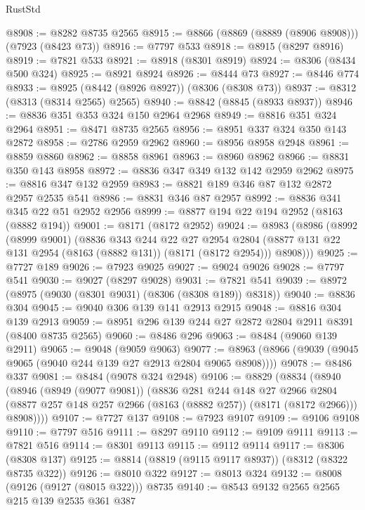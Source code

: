 \begin{lexlean}{RustStd}
\begin{coremodule}
@8908 := @8282 @8735 @2565
@8915 := @8866 (@8869 (@8889 (@8906 @8908))) (@7923 (@8423 @73))
@8916 := @7797 @533
@8918 := @8915 (@8297 @8916)
@8919 := @7821 @533
@8921 := @8918 (@8301 @8919)
@8924 := @8306 (@8434 @500 @324)
@8925 := @8921 @8924
@8926 := @8444 @73
@8927 := @8446 @774
@8933 := @8925 (@8442 (@8926 @8927)) (@8306 (@8308 @73))
@8937 := @8312 (@8313 (@8314 @2565) @2565)
@8940 := @8842 (@8845 (@8933 @8937))
@8946 := @8836 @351 @353 @324 @150 @2964 @2968
@8949 := @8816 @351 @324 @2964
@8951 := @8471 @8735 @2565
@8956 := @8951 @337 @324 @350 @143 @2872
@8958 := @2786 @2959 @2962
@8960 := @8956 @8958 @2948
@8961 := @8859 @8860
@8962 := @8858 @8961
@8963 := @8960 @8962
@8966 := @8831 @350 @143 @8958
@8972 := @8836 @347 @349 @132 @142 @2959 @2962
@8975 := @8816 @347 @132 @2959
@8983 := @8821 @189 @346 @87 @132 @2872 @2957 @2535 @541
@8986 := @8831 @346 @87 @2957
@8992 := @8836 @341 @345 @22 @51 @2952 @2956
@8999 := @8877 @194 @22 @194 @2952 (@8163 (@8882 @194))
@9001 := @8171 (@8172 @2952)
@9024 := @8983
    (@8986
      (@8992
        (@8999 @9001)
        (@8836
          @343
          @244
          @22
          @27
          @2954
          @2804
          (@8877 @131 @22 @131 @2954 (@8163 (@8882 @131)) (@8171 (@8172 @2954)))
          @8908)))
@9025 := @7727 @189
@9026 := @7923 @9025
@9027 := @9024 @9026
@9028 := @7797 @541
@9030 := @9027 (@8297 @9028)
@9031 := @7821 @541
@9039 := @8972 (@8975 (@9030 (@8301 @9031) (@8306 (@8308 @189)) @8318))
@9040 := @8836 @304
@9045 := @9040 @306 @139 @141 @2913 @2915
@9048 := @8816 @304 @139 @2913
@9059 := @8951 @296 @139 @244 @27 @2872 @2804 @2911 @8391 (@8400 @8735 @2565)
@9060 := @8486 @296
@9063 := @8484 (@9060 @139 @2911)
@9065 := @9048 (@9059 @9063)
@9077 := @8963 (@8966 (@9039 (@9045 @9065 (@9040 @244 @139 @27 @2913 @2804 @9065 @8908))))
@9078 := @8486 @337
@9081 := @8484 (@9078 @324 @2948)
@9106 := @8829
    (@8834
      (@8940
        (@8946
          (@8949 (@9077 @9081))
          (@8836
            @281
            @244
            @148
            @27
            @2966
            @2804
            (@8877 @257 @148 @257 @2966 (@8163 (@8882 @257)) (@8171 (@8172 @2966)))
            @8908))))
@9107 := @7727 @137
@9108 := @7923 @9107
@9109 := @9106 @9108
@9110 := @7797 @516
@9111 := @8297 @9110
@9112 := @9109 @9111
@9113 := @7821 @516
@9114 := @8301 @9113
@9115 := @9112 @9114
@9117 := @8306 (@8308 @137)
@9125 := @8814 (@8819 (@9115 @9117 @8937)) (@8312 (@8322 @8735 @322))
@9126 := @8010 @322
@9127 := @8013 @324
@9132 := @8008 (@9126 (@9127 (@8015 @322))) @8735
@9140 := @8543 @9132 @2565 @2565 @215 @139 @2535 @361 @387

\end{coremodule}
\end{lexlean}
